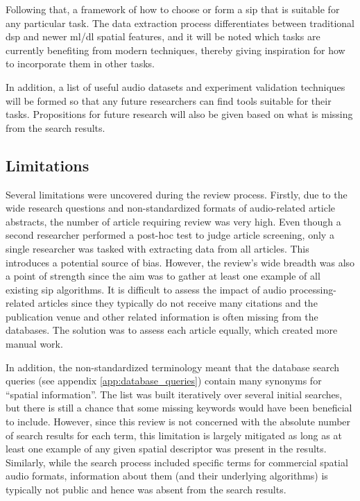 \documentclass[referee,pdflatex,sn-mathphys-num]{sn-jnl}%
\newcommand{\q}[1]{\enquote{#1}}
\begin{document}
Following that, a framework of how to choose or form a \gls{sip} that is suitable for any particular task. The data extraction process differentiates between traditional \gls{dsp} and newer \gls{ml}/\gls{dl} spatial features, and it will be noted which tasks are currently benefiting from modern techniques, thereby giving inspiration for how to incorporate them in other tasks.

In addition, a list of useful audio datasets and experiment validation techniques will be formed so that any future researchers can find tools suitable for their tasks. Propositions for future research will also be given based on what is missing from the search results.

\subsection{Limitations}
Several limitations were uncovered during the review process. Firstly, due to the wide research questions and non-standardized formats of audio-related article abstracts, the number of article requiring review was very high. Even though a second researcher performed a post-hoc test to judge article screening, only a single researcher was tasked with extracting data from all articles. This introduces a potential source of bias. However, the review's wide breadth was also a point of strength since the aim was to gather at least one example of all existing \gls{sip} algorithms. It is difficult to assess the impact of audio processing-related articles since they typically do not receive many citations and the publication venue and other related information is often missing from the databases. The solution was to assess each article equally, which created more manual work.

In addition, the non-standardized terminology meant that the database search queries (see appendix \ref{app:database_queries}) contain many synonyms for \q{spatial information}. The list was built iteratively over several initial searches, but there is still a chance that some missing keywords would have been beneficial to include. However, since this review is not concerned with the absolute number of search results for each term, this limitation is largely mitigated as long as at least one example of any given spatial descriptor was present in the results. Similarly, while the search process included specific terms for commercial spatial audio formats, information about them (and their underlying algorithms) is typically not public and hence was absent from the search results.
\end{document}
